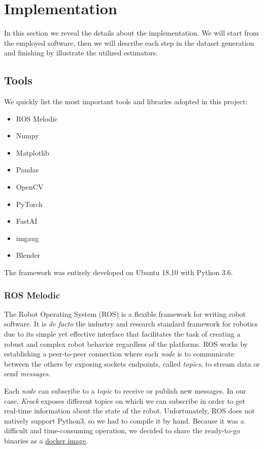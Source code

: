 \documentclass[../document.tex]{subfiles}
\begin{document}
\section{Implementation}
In this section we reveal the details about the implementation. We will start from the employed software, then we will describe each step in the dataset generation and finishing by illustrate the utilized estimators.
\subsection{Tools}
We quickly list the most important tools and libraries adopted in this project:
\begin{itemize}
    \item ROS Melodic
    \item Numpy
    \item Matplotlib
    \item Pandas
    \item OpenCV
    \item PyTorch
    \item FastAI
    \item imgaug
    \item Blender
\end{itemize}
The framework was entirely developed on Ubuntu 18.10 with Python 3.6.

\subsubsection{ROS Melodic}
The Robot Operating System (ROS) \cite{ROS} is a flexible framework for writing robot software. It is \emph{de facto} the industry and research standard framework for robotics due to its simple yet effective interface that facilitates the task of creating a robust and complex robot behavior regardless of the platforms. ROS works by establishing a peer-to-peer connection where each \emph{node} is to communicate between the others by exposing sockets endpoints, called \emph{topics}, to stream data or send \emph{messages}. 

Each \emph{node} can subscribe to a \emph{topic} to receive or publish new messages. In our case, \emph{Krock} exposes different topics on which we can subscribe in order to get real-time information about the state of the robot.
Unfortunately, ROS does not natively support Python3, so we had to compile it by hand. Because it was a difficult and time-consuming operation, we decided to share the ready-to-go binaries as a \href{https://hub.docker.com/r/zuppif/ros-melodic-python3/}{docker image}. 
\end{document}
